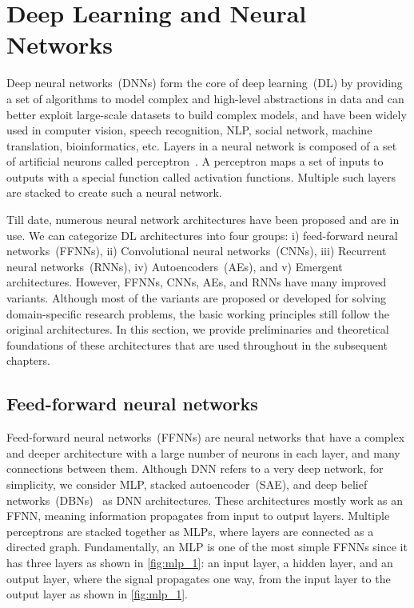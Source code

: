 \section{Deep Learning and Neural Networks}
Deep neural networks~(DNNs) form the core of deep learning~(DL) by providing a set of algorithms to model complex and high-level abstractions in data and can better exploit large-scale datasets to build complex models, and have been widely used in computer vision, speech recognition, NLP, social network, machine translation, bioinformatics, etc. Layers in a neural network is composed of a set of artificial neurons called perceptron~\cite{yuan2019adversarial}. A perceptron maps a set of inputs to outputs with a special function called activation functions. Multiple such layers are stacked to create such a neural network. 

\hspace*{3.5mm} Till date, numerous neural network architectures have been proposed and are in use. We can categorize DL architectures into four groups: i) feed-forward neural networks~(FFNNs), ii) Convolutional neural networks~(CNNs), iii) Recurrent neural networks~(RNNs), iv) Autoencoders~(AEs), and v) Emergent architectures. However, FFNNs, CNNs, AEs, and RNNs have many improved variants. Although most of the variants are proposed or developed for solving domain-specific research problems, the basic working principles still follow the original  architectures. In this section, we provide preliminaries and theoretical foundations of these architectures that are used throughout in the subsequent chapters.  

\subsection{Feed-forward neural networks}
Feed-forward neural networks~(FFNNs) are neural networks that have a complex and deeper architecture with a large number of neurons in each layer, and many connections between them. Although DNN refers to a very deep network, for simplicity, we consider MLP, stacked autoencoder~(SAE), and deep belief networks~(DBNs)~\cite{Hinton:2009} as DNN architectures. These architectures mostly work as an FFNN, meaning information propagates from input to output layers. Multiple perceptrons are stacked together as MLPs, where layers are connected as a directed graph. Fundamentally, an MLP is one of the most simple FFNNs since it has three layers as shown in \cref{fig:mlp_1}: an input layer, a hidden layer, and an output layer, where the signal propagates one way, from the input layer to the output layer as shown in \cref{fig:mlp_1}.

